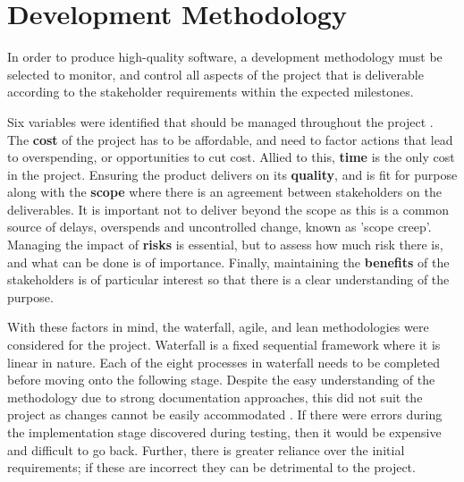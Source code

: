 
\section{Development Methodology}
In order to produce high-quality software, a development methodology must be selected to monitor, and control all aspects of the project that is deliverable according to the stakeholder requirements within the expected milestones. 

Six variables were identified that should be managed throughout the project \cite{prince2}. The \textbf{cost} of the project has to be affordable, and need to factor actions that lead to overspending, or opportunities to cut cost. Allied to this, \textbf{time} is the only cost in the project. Ensuring the product delivers on its \textbf{quality}, and is fit for purpose along with the \textbf{scope} where there is an agreement between stakeholders on the deliverables. It is important not to deliver beyond the scope as this is a common source of delays, overspends and uncontrolled change, known as 'scope creep'. Managing the impact of \textbf{risks} is essential, but to assess how much risk there is, and what can be done is of importance. Finally, maintaining the \textbf{benefits} of the stakeholders is of particular interest so that there is a clear understanding of the purpose.

With these factors in mind, the waterfall, agile, and lean methodologies were considered for the project. Waterfall is a fixed sequential framework where it is linear in nature. Each of the eight processes in waterfall needs to be completed before moving onto the following stage. Despite the easy understanding of the methodology due to strong documentation approaches, this did not suit the project as changes cannot be easily accommodated \cite{smartsheet}. If there were errors during the implementation stage discovered during testing, then it would be expensive and difficult to go back. Further, there is greater reliance over the initial requirements; if these are incorrect they can be detrimental to the project. 

